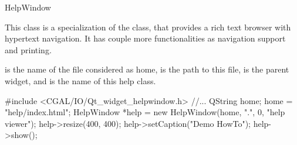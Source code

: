 
\begin{ccRefClass}{HelpWindow}

\ccDefinition
This class is a specialization of the  class, that
provides a rich text browser with hypertext navigation. It has couple
more functionalities as navigation support and printing.

\ccGlue

\ccInheritsFrom
{}

\ccCreation
{}
{ is the name of the file considered as home,  is 
the path to this file,  is the parent widget, and
 is the name of this help class.}




\ccExample
\begin{ccExampleCode}
  #include <CGAL/IO/Qt_widget_helpwindow.h>
  //...
  QString home;
  home = "help/index.html";
  HelpWindow *help = new HelpWindow(home, ".", 0, "help viewer");
  help->resize(400, 400);
  help->setCaption("Demo HowTo");
  help->show();
\end{ccExampleCode}

\end{ccRefClass}

